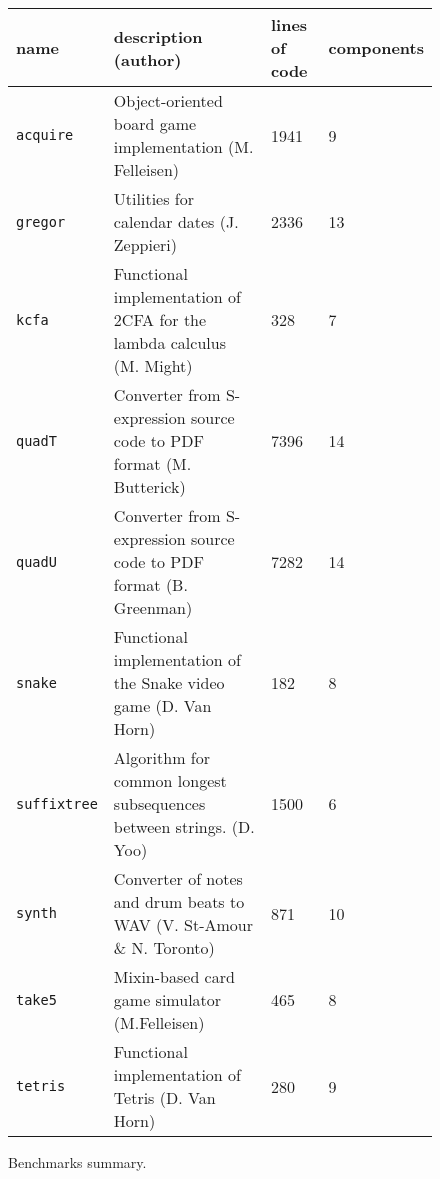 

\begin{figure}
\begin{tabular}{p{1.75cm} | p{4.2cm} | p{2.2cm} | p{2.2cm}}
  {\bf  name} & {\bf description (author)} & {\bf lines of code} & {\bf
  components} \\

\hline
  \texttt{acquire} & Object-oriented board game implementation (M.
  Felleisen) & 1941 & 9 \\%

\hline
  \texttt{gregor} & Utilities for calendar dates (J. Zeppieri) & 2336 & 13\\%

\hline
  \texttt{kcfa} & Functional implementation of 2CFA for the lambda
  calculus (M. Might) & 328 & 7\\%

\hline
  \texttt{quadT} & Converter from S-expression source code to PDF format
  (M. Butterick) & 7396 & 14\\%

\hline
  \texttt{quadU} & Converter from S-expression source code to PDF format
  (B. Greenman) & 7282 & 14 \\%

\hline
  \texttt{snake} & Functional implementation of the  Snake video game (D.
  Van Horn) & 182 & 8 \\%

\hline
  \texttt{suffixtree} & Algorithm for common longest subsequences between
  strings. (D. Yoo) & 1500 & 6 \\%

\hline
  \texttt{synth} & Converter of notes and drum beats to WAV (V. St-Amour
  \& N. Toronto) & 871 & 10 \\%

\hline
  \texttt{take5} & Mixin-based card game simulator (M.Felleisen)  & 465 &
  8\\%

\hline
  \texttt{tetris} & Functional implementation of Tetris (D. Van Horn) &
  280 & 9 \\%

\end{tabular}
  \caption{Benchmarks summary.}
  \label{table:benchmark-descriptions}
\end{figure}

